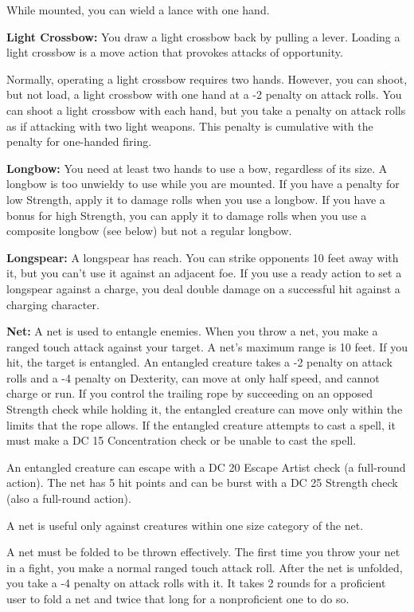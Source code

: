 \begin{multicols}{2}
While mounted, you can wield a lance with one hand.

\textbf{Light Crossbow:} You draw a light crossbow back by pulling a lever. Loading a light crossbow is a move action that provokes attacks of opportunity.

Normally, operating a light crossbow requires two hands. However, you can shoot, but not load, a light crossbow with one hand at a -2 penalty on attack rolls. You can shoot a light crossbow with each hand, but you take a penalty on attack rolls as if attacking with two light weapons. This penalty is cumulative with the penalty for one-handed firing.

\textbf{Longbow:} You need at least two hands to use a bow, regardless of its size. A longbow is too unwieldy to use while you are mounted. If you have a penalty for low Strength, apply it to damage rolls when you use a longbow. If you have a bonus for high Strength, you can apply it to damage rolls when you use a composite longbow (see below) but not a regular longbow.

\textbf{Longspear:} A longspear has reach. You can strike opponents 10 feet away with it, but you can't use it against an adjacent foe. If you use a ready action to set a longspear against a charge, you deal double damage on a successful hit against a charging character.

\textbf{Net:} A net is used to entangle enemies. When you throw a net, you make a ranged touch attack against your target. A net's maximum range is 10 feet. If you hit, the target is entangled. An entangled creature takes a -2 penalty on attack rolls and a -4 penalty on Dexterity, can move at only half speed, and cannot charge or run. If you control the trailing rope by succeeding on an opposed Strength check while holding it, the entangled creature can move only within the limits that the rope allows. If the entangled creature attempts to cast a spell, it must make a DC 15 Concentration check or be unable to cast the spell.

An entangled creature can escape with a DC 20 Escape Artist check (a full-round action). The net has 5 hit points and can be burst with a DC 25 Strength check (also a full-round action).

A net is useful only against creatures within one size category of the net.

A net must be folded to be thrown effectively. The first time you throw your net in a fight, you make a normal ranged touch attack roll. After the net is unfolded, you take a -4 penalty on attack rolls with it. It takes 2 rounds for a proficient user to fold a net and twice that long for a nonproficient one to do so.


\end{multicols}
